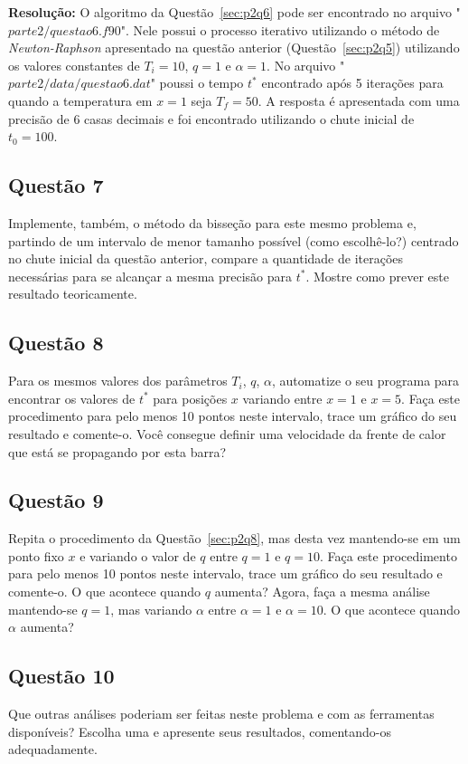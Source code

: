 \documentclass[12pt]{article}
\begin{document}
\textbf{Resolução:}
O algoritmo da Questão~\ref{sec:p2q6} pode ser encontrado no arquivo "$\textit{parte2/questao6.f90}$". Nele possui o processo iterativo utilizando o método de \textit{Newton-Raphson} apresentado na questão anterior (Questão~\ref{sec:p2q5}) utilizando os valores constantes de $T_{i} = 10$, $q = 1$ e $\alpha = 1$. No arquivo "$\textit{parte2/data/questao6.dat}$" poussi o tempo $t^{*}$ encontrado após 5 iterações para quando a temperatura em $x = 1$ seja $T_{f} = 50$. A resposta é apresentada com uma precisão de 6 casas decimais e foi encontrado utilizando o chute inicial de $t_{0} = 100$.

\subsection*{Questão 7}
\label{sec:p2q7}
Implemente, também, o método da bisseção para este mesmo problema e, partindo de um intervalo de menor tamanho possível (como escolhê-lo?) centrado no chute inicial da questão anterior, compare a quantidade de iterações necessárias para se alcançar a mesma precisão para $t^{*}$. Mostre como prever este resultado teoricamente.

\subsection*{Questão 8}
\label{sec:p2q8}
Para os mesmos valores dos parâmetros $T_{i}$, $q$, $\alpha$, automatize o seu programa para encontrar os valores de $t^{*}$ para posições $x$ variando entre $x = 1$ e $x = 5$. Faça este procedimento para pelo menos 10 pontos neste intervalo, trace um gráfico do seu resultado e comente-o. Você consegue definir uma velocidade da frente de calor que está se propagando por esta barra?

\subsection*{Questão 9}
\label{sec:p2q9}
Repita o procedimento da Questão~\ref{sec:p2q8}, mas desta vez mantendo-se em um ponto fixo $x$ e variando o valor de $q$ entre $q = 1$ e $q = 10$. Faça este procedimento para pelo menos 10 pontos neste intervalo, trace um gráfico do seu resultado e comente-o. O que acontece quando $q$ aumenta? Agora, faça a mesma análise mantendo-se $q = 1$, mas variando $\alpha$ entre $\alpha = 1$ e $\alpha = 10$. O que acontece quando $\alpha$ aumenta?

\subsection*{Questão 10}
\label{sec:p2q10}
Que outras análises poderiam ser feitas neste problema e com as ferramentas disponíveis? Escolha uma e apresente seus resultados, comentando-os adequadamente.
\end{document}
